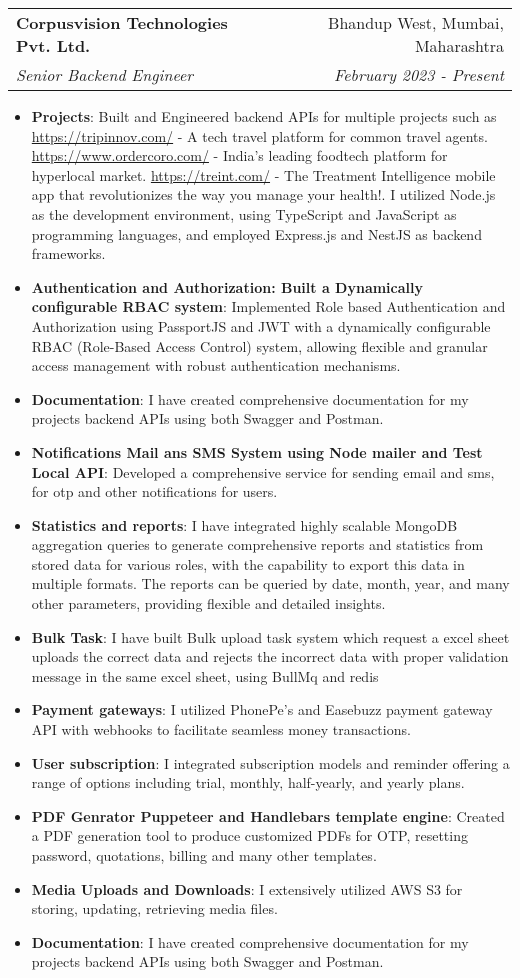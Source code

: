 \documentclass[letterpaper,11pt]{article}
\makeatletter
\newcommand{\resumeItem}[2]{
  \item\small{
    \textbf{#1}{: #2 \vspace{-2pt}}
  }
}
\newcommand{\resumeSubheading}[4]{
  \vspace{-1pt}\item
    \begin{tabular*}{0.97\textwidth}{l@{\extracolsep{\fill}}r}
      \textbf{#1} & #2 \\
      \textit{\small#3} & \textit{\small #4} \\
    \end{tabular*}\vspace{-5pt}
}
\newcommand{\resumeItemListStart}{\begin{itemize}}
\newcommand{\resumeItemListEnd}{\end{itemize}\vspace{-5pt}}
\makeatother
\begin{document}
  \resumeSubheading
  {Corpusvision Technologies Pvt. Ltd.}{Bhandup West, Mumbai, Maharashtra}
  {Senior Backend Engineer}{February 2023 - Present}
  \resumeItemListStart
  \resumeItem{Projects}
       {Built and Engineered backend APIs for multiple projects such as
       \href{https://tripinnov.com/}{https://tripinnov.com/} - A tech travel platform for common travel agents.
       \href{https://www.ordercoro.com/}{https://www.ordercoro.com/} - India’s leading foodtech platform for hyperlocal market.
       \href{https://treint.com/}{https://treint.com/} - The Treatment Intelligence mobile app that revolutionizes the way you manage your health!.
       I utilized Node.js as the development environment, using TypeScript and JavaScript as programming languages, and employed Express.js and NestJS as backend frameworks.
       }
    \resumeItem{Authentication and Authorization: Built a Dynamically configurable RBAC system}
        {Implemented Role based Authentication and Authorization using PassportJS and JWT with a dynamically configurable RBAC (Role-Based Access Control) system, allowing flexible and granular access management with robust authentication mechanisms.}
    \resumeItem{Documentation}
        {I have created comprehensive documentation for my projects backend APIs using both Swagger and Postman.}
    \resumeItem{Notifications Mail ans SMS System using Node mailer and Test Local API}
        {Developed a comprehensive service for sending email and sms, for otp and other notifications for users.}
    \resumeItem{Statistics and reports}
        {I have integrated highly scalable MongoDB aggregation queries to generate comprehensive reports and statistics from stored data for various roles, with the capability to export this data in multiple formats. The reports can be queried by date, month, year, and many other parameters, providing flexible and detailed insights.}
    \resumeItem{Bulk Task}
        {I have built Bulk upload task system which request a excel sheet uploads the correct data and rejects the incorrect data with proper validation message in the same excel sheet, using BullMq and redis}
    \resumeItem{Payment gateways}
        {I utilized PhonePe's and Easebuzz payment gateway API with webhooks to facilitate seamless money transactions.}
    \resumeItem{User subscription}
        {I integrated subscription models and reminder offering a range of options including trial, monthly, half-yearly, and yearly plans.}
    \resumeItem{PDF Genrator Puppeteer and Handlebars template engine}
        {Created a PDF generation tool to produce customized PDFs for OTP, resetting password, quotations, billing and many other templates.}
    \resumeItem{Media Uploads and Downloads}
        {I extensively utilized AWS S3 for storing, updating, retrieving media files.}
    \resumeItem{Documentation}
        {I have created comprehensive documentation for my projects backend APIs using both Swagger and Postman.}
  \resumeItemListEnd
\end{document}
